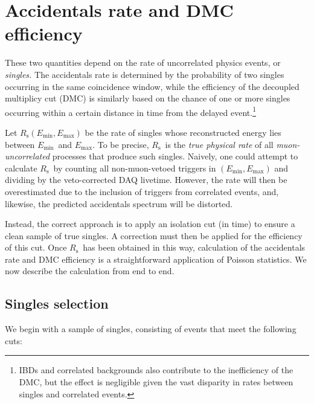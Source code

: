 \documentclass[../thesis.tex]{subfiles}
\begin{document}
\chapter{Accidentals rate and DMC efficiency}
\label{chap:accDMC}

These two quantities depend on the rate of uncorrelated physics events, or \emph{singles.} The accidentals rate is determined by the probability of two singles occurring in the same coincidence window, while the efficiency of the decoupled multiplicy cut (DMC) is similarly based on the chance of one or more singles occurring within a certain distance in time from the delayed event.\footnote{IBDs and correlated backgrounds also contribute to the inefficiency of the DMC, but the effect is negligible given the vast disparity in rates between singles and correlated events.}

\def\Emin{\ensuremath{E_\mathrm{min}}}
\def\Emax{\ensuremath{E_\mathrm{max}}}
\def\Rs{\ensuremath{R_\mathrm{s}}}

Let $\Rs(\Emin, \Emax)$ be the rate of singles whose reconstructed energy lies between \Emin\ and \Emax. To be precise, \Rs\ is the \emph{true physical rate} of all \emph{muon-uncorrelated} processes that produce such singles. Naively, one could attempt to calculate \Rs\ by counting all non-muon-vetoed triggers in $(\Emin, \Emax)$ and dividing by the veto-corrected DAQ livetime. However, the rate will then be overestimated due to the inclusion of triggers from correlated events, and, likewise, the predicted accidentals spectrum will be distorted.

Instead, the correct approach is to apply an isolation cut (in time) to ensure a clean sample of true singles. A correction must then be applied for the efficiency of this cut. Once \Rs\ has been obtained in this way, calculation of the accidentals rate and DMC efficiency is a straightforward application of Poisson statistics. We now describe the calculation from end to end.

\section{Singles selection}
\label{sec:singsel}

We begin with a sample of singles, consisting of events that meet the following cuts:
\end{document}
